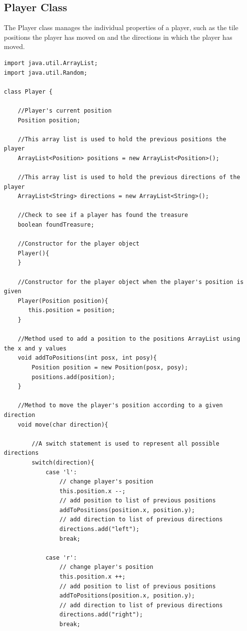 \documentclass[a4paper,12pt]{extarticle}
\begin{document}
\subsection{Player Class}


The Player class manages the individual properties of a player, such as the tile positions the player has moved on and the directions in which the player has moved.

\begin{lstlisting}[caption=The initial code of the Player class]
import java.util.ArrayList;
import java.util.Random;

class Player {

    //Player's current position
    Position position;

    //This array list is used to hold the previous positions the player
    ArrayList<Position> positions = new ArrayList<Position>();

    //This array list is used to hold the previous directions of the player
    ArrayList<String> directions = new ArrayList<String>();

    //Check to see if a player has found the treasure
    boolean foundTreasure;

    //Constructor for the player object
    Player(){
    }

    //Constructor for the player object when the player's position is given
    Player(Position position){
       this.position = position;
    }

    //Method used to add a position to the positions ArrayList using the x and y values
    void addToPositions(int posx, int posy){
        Position position = new Position(posx, posy);
        positions.add(position);
    }

    //Method to move the player's position according to a given direction
    void move(char direction){

        //A switch statement is used to represent all possible directions
        switch(direction){
            case 'l':
                // change player's position
                this.position.x --;
                // add position to list of previous positions
                addToPositions(position.x, position.y);
                // add direction to list of previous directions
                directions.add("left");
                break;

            case 'r':
                // change player's position
                this.position.x ++;
                // add position to list of previous positions
                addToPositions(position.x, position.y);
                // add direction to list of previous directions
                directions.add("right");
                break;


\end{lstlisting}
\end{document}
